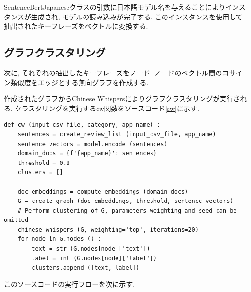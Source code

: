 

%

SentenceBertJapaneseクラスの引数に日本語モデル名を与えることによりインスタンスが生成され, モデルの読み込みが完了する. このインスタンスを使用して抽出されたキーフレーズをベクトルに変換する. 

\subsection{グラフクラスタリング}
次に, それぞれの抽出したキーフレーズをノード, ノードのベクトル間のコサイン類似度をエッジとする無向グラフを作成する. 

作成されたグラフからChinese Whispersによりグラフクラスタリングが実行される. クラスタリングを実行するcw関数をソースコード\ref{cw}に示す. 

\begin{lstlisting}[caption=cw関数,label=cw]
  def cw (input_csv_file, category, app_name) :
    sentences = create_review_list (input_csv_file, app_name) 
    sentence_vectors = model.encode (sentences) 
    domain_docs = {f'{app_name}': sentences}
    threshold = 0.8
    clusters = []
    
    doc_embeddings = compute_embeddings (domain_docs) 
    G = create_graph (doc_embeddings, threshold, sentence_vectors) 
    # Perform clustering of G, parameters weighting and seed can be omitted
    chinese_whispers (G, weighting='top', iterations=20) 
    for node in G.nodes () :
        text = str (G.nodes[node]['text']) 
        label = int (G.nodes[node]['label']) 
        clusters.append ([text, label]) 
\end{lstlisting}

このソースコードの実行フローを次に示す. 

